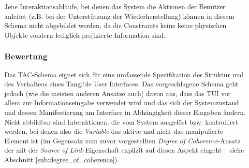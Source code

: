 
Jene Interaktionsabläufe, bei denen das System die Aktionen der Benutzer anleitet (z.B. bei der Unterstützung der Wiederherstellung) können in diesem Schema nicht abgebildet werden, da die Constraints keine keine physischen Objekte sondern lediglich projizierte Information sind.

\subsubsection{Bewertung}

Das \gls{TAC}-Schema eignet sich für eine umfassende Spezifikation des Struktur und des Verhaltens eines Tangible User Interfaces. Das vorgeschlagene Schema geht jedoch (wie die meisten anderen Ansätze auch) davon aus, dass das \gls{TUI} vor allem zur Informationseingabe verwendet wird und das sich der Systemzustand und dessen Manifestierung am Interface in Abhängigkeit dieser Eingaben ändern. Nicht abbildbar sind Interaktionen, die vom System ausgelöst bzw. kontrolliert werden, bei denen also die \emph{Variable} das aktive und nicht das manipulierte Element ist (im Gegensatz zum zuvor vorgestellten \emph{Degree of Coherence}-Ansatz der mit der \emph{Source of Link}-Eigenschaft explizit auf diesen Aspekt eingeht -- siehe Abschnitt \ref{sub:degree_of_coherence}).

